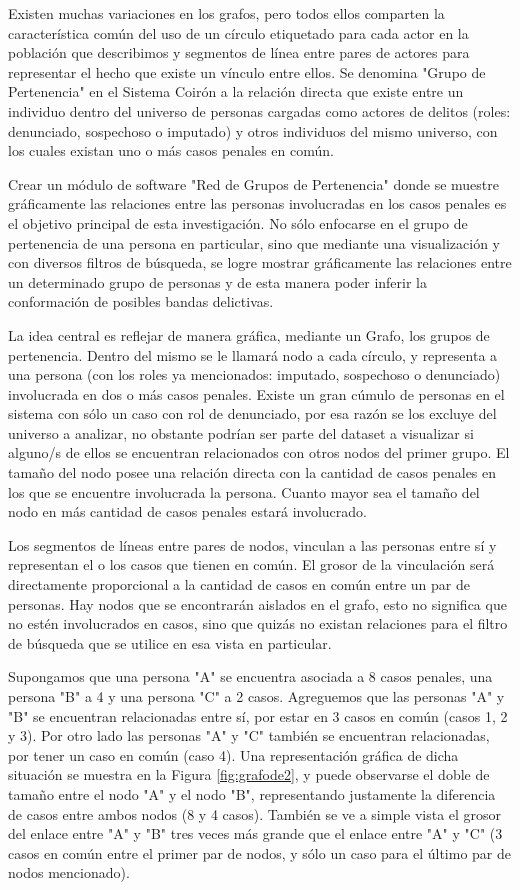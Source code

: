 Existen muchas variaciones en los grafos, pero todos ellos comparten la característica común del uso de un círculo etiquetado para cada actor en la población que describimos y segmentos de línea entre pares de actores para representar el hecho que existe un vínculo entre ellos. Se denomina "Grupo de Pertenencia" en el Sistema Coirón a la relación directa que existe entre un individuo dentro del universo de personas cargadas como actores de delitos (roles: denunciado, sospechoso o imputado) y otros individuos del mismo universo, con los cuales existan uno o más casos penales en común.

Crear un módulo de software "Red de Grupos de Pertenencia" donde se muestre gráficamente las relaciones entre las personas involucradas en los casos penales es el objetivo principal de esta investigación. No sólo enfocarse en el grupo de pertenencia de una persona en particular, sino que mediante una visualización y con diversos filtros de búsqueda, se logre mostrar gráficamente las relaciones entre un determinado grupo de personas y de esta manera poder inferir la conformación de posibles bandas delictivas.

La idea central es reflejar de manera gráfica, mediante un Grafo, los grupos de pertenencia. Dentro del mismo se le llamará nodo a cada círculo, y representa a una persona (con los roles ya mencionados: imputado, sospechoso o denunciado) involucrada en dos o más casos penales. Existe un gran cúmulo de personas en el sistema con sólo un caso con rol de denunciado, por esa razón se los excluye del universo a analizar, no obstante podrían ser parte del dataset a visualizar si alguno/s de ellos se encuentran relacionados con otros nodos del primer grupo. El tamaño del nodo posee una relación directa con la cantidad de casos penales en los que se encuentre involucrada la persona. Cuanto mayor sea el tamaño del nodo en más cantidad de casos penales estará involucrado.

Los segmentos de líneas entre pares de nodos, vinculan a las personas entre sí y representan el o los casos que tienen en común. El grosor de la vinculación será directamente proporcional a la cantidad de casos en común entre un par de personas. Hay nodos que se encontrarán aislados en el grafo, esto no significa que no estén involucrados en casos, sino que quizás no existan relaciones para el filtro de búsqueda que se utilice en esa vista en particular.

Supongamos que una persona "A" se encuentra asociada a 8 casos penales, una persona "B" a 4 y una persona "C" a 2 casos. Agreguemos que las personas "A" y "B" se encuentran relacionadas entre sí, por estar en 3 casos en común (casos 1, 2 y 3). Por otro lado las personas "A" y "C" también se encuentran relacionadas, por tener un caso en común (caso 4).  Una representación gráfica de dicha situación se muestra en la Figura \ref{fig:grafode2}, y puede observarse el doble de tamaño entre el nodo "A" y el nodo "B", representando justamente la diferencia de casos entre ambos nodos (8 y 4 casos). También se ve a simple vista el grosor del enlace entre "A" y "B" tres veces más grande que el enlace entre "A" y "C" (3 casos en común entre el primer par de nodos, y sólo un caso para el último par de nodos mencionado). 

